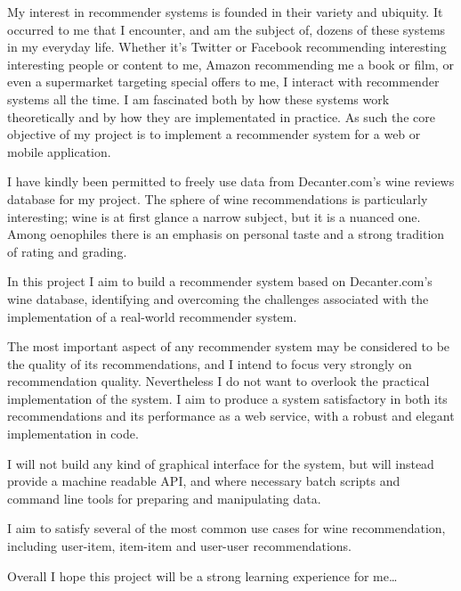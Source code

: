 My interest in recommender systems is founded in their variety and ubiquity. It occurred to me that I encounter, and am the subject of, dozens of these systems in my everyday life. Whether it's Twitter or Facebook recommending interesting interesting people or content to me, Amazon recommending me a book or film, or even a supermarket targeting special offers to me, I interact with recommender systems all the time. I am fascinated both by how these systems work theoretically and by how they are implementated in practice. As such the core objective of my project is to implement a recommender system for a web or mobile application.

I have kindly been permitted to freely use data from Decanter.com's wine reviews database \cite{DecanterWine} for my project. The sphere of wine recommendations is particularly interesting; wine is at first glance a narrow subject, but it is a nuanced one. Among oenophiles there is an emphasis on personal taste and a strong tradition of rating and grading. 

In this project I aim to build a recommender system based on Decanter.com's wine database, identifying and overcoming the challenges associated with the implementation of a real-world recommender system.

The most important aspect of any recommender system may be considered to be the quality of its recommendations, and I intend to focus very strongly on recommendation quality. Nevertheless I do not want to overlook the practical implementation of the system. I aim to produce a system satisfactory in both its recommendations and its performance as a web service, with a robust and elegant implementation in code. 

I will not build any kind of graphical interface for the system, but will instead provide a machine readable API, and where necessary batch scripts and command line tools for preparing and manipulating data.

I aim to satisfy several of the most common use cases for wine recommendation, including user-item, item-item and user-user recommendations.

Overall I hope this project will be a strong learning experience for me\ldots

